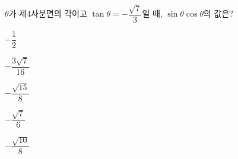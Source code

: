 $\theta$가 제4사분면의 각이고 $\tan\theta=-\dfrac{\sqrt{7}}{3}$일 때, $\sin\theta\cos\theta$의 값은?
\begin{choices32}{\rule[-3ex]{0pt}{8ex}$-\dfrac{1}{2}$}{\rule[-3ex]{0pt}{8ex}$-\dfrac{3\sqrt{7}}{16}$}{\rule[-3ex]{0pt}{8ex}$-\dfrac{\sqrt{15}}{8}$}{\rule[-3ex]{0pt}{8ex}$-\dfrac{\sqrt{7}}{6}$}{\rule[-3ex]{0pt}{8ex}$-\dfrac{\sqrt{10}}{8}$}\end{choices32}

